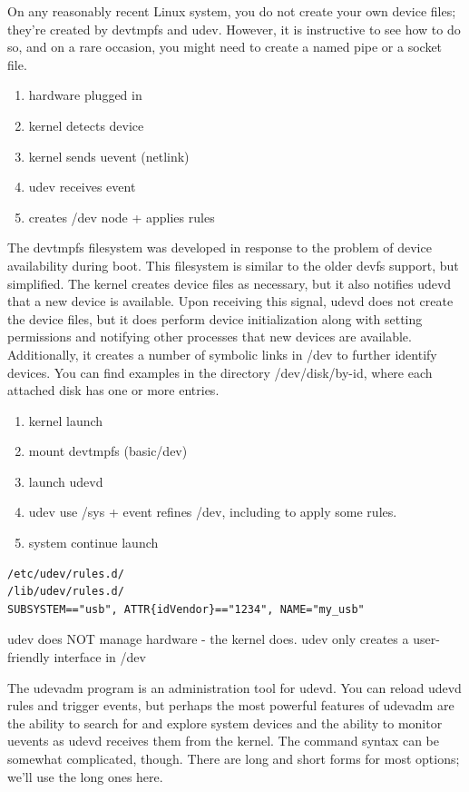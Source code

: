 \documentclass[paper=8.5in:11in, twoside, 12pt, pagesize=pdftex]{book}
\begin{document}
	\par On any reasonably recent Linux system, you do not create your own device files; they’re created by devtmpfs and udev. However, it is instructive to see how to do so, and on a rare occasion, you might need to create a named pipe or a socket file.
\begin{enumerate}
\item hardware plugged in
\item kernel detects device
\item kernel sends uevent (netlink)
\item udev receives event
\item creates /dev node + applies rules
\end{enumerate}

 \par The devtmpfs filesystem was developed in response to the problem of device availability during boot. This filesystem is similar to the older devfs support, but simplified. The kernel creates device files as necessary, but it also notifies udevd that a new device is available. Upon receiving this signal, udevd does not create the device files, but it does perform device initialization along with setting permissions and notifying other processes that new devices are available. Additionally, it creates a number of symbolic links in /dev to further identify devices. You can find examples in the directory /dev/disk/by-id, where each attached disk has one or more entries.

\begin{enumerate}
\item kernel launch
\item mount devtmpfs (basic/dev)   
\item launch udevd   
\item udev use /sys + event refines /dev, including to apply some rules.
\item system continue launch
\end{enumerate}


\begin{lstlisting}
/etc/udev/rules.d/
/lib/udev/rules.d/
SUBSYSTEM=="usb", ATTR{idVendor}=="1234", NAME="my_usb"
\end{lstlisting}

	\par udev does NOT manage hardware - the kernel does. udev only creates a user-friendly interface in /dev

	\par The udevadm program is an administration tool for udevd. You can reload udevd rules and trigger events, but perhaps the most powerful features of udevadm are the ability to search for and explore system devices and the ability to monitor uevents as udevd receives them from the kernel. The command syntax can be somewhat complicated, though. There are long and short forms for most options; we’ll use the long ones here.
\end{document}

